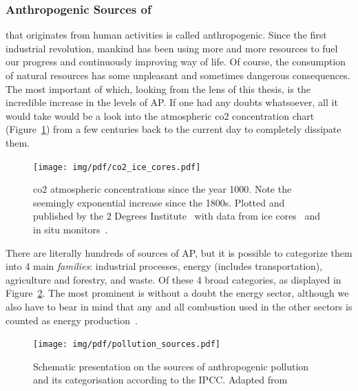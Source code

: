 \subsubsection{Anthropogenic Sources of }%
\label{ssub:anthropogenic_sources_of_ap}

 that originates from human activities is called
anthropogenic. Since the first industrial revolution, mankind has been
using more and more resources to fuel our progress and continuously
improving way of life. Of course, the consumption of natural resources
has some unpleasant and sometimes dangerous consequences. The most
important of which, looking from the lens of this thesis, is the
incredible increase in the levels of \gls{AP}. If one had any doubts
whatsoever, all it would take would be a look into the atmospheric
\gls{co2} concentration chart (Figure~\ref{fig:co2_concentration}) from
a few centuries back to the current day to completely dissipate them.

\begin{figure}[htpb]
    \centering
    \texttt{[image: img/pdf/co2\_ice\_cores.pdf]}
                     \caption{\gls{co2} atmospheric concentrations since
                         the year 1000. Note the seemingly exponential
                         increase since the 1800s. Plotted and published
                         by the 2 Degrees Institute~\cite{co2levels2020}
                         with data from ice cores~\cite{Etheridge} and
                         in situ monitors~\cite{Tans}.}
    \label{fig:co2_concentration}
\end{figure}

There are literally hundreds of sources of \gls{AP}, but it is possible
to categorize them into 4 main \emph{families}: industrial processes,
energy (includes transportation), agriculture and forestry, and waste.
Of these 4 broad categories, as displayed in
Figure~\ref{fig:anthropogenic_pollution_categories}. The most prominent
is without a doubt the energy sector, although we also have to bear in
mind that any and all combustion used in the other sectors is counted as
energy production~\cite{InternationalAgencyforResearchonCancer2016,
CABI2019}.

\begin{figure}[htpb]
    \centering
    \texttt{[image: img/pdf/pollution\_sources.pdf]}
    \caption{Schematic presentation on the sources of anthropogenic
    pollution and its categorisation according to the IPCC. Adapted
    from~\cite{CABI2019}}
    \label{fig:anthropogenic_pollution_categories}
\end{figure}

